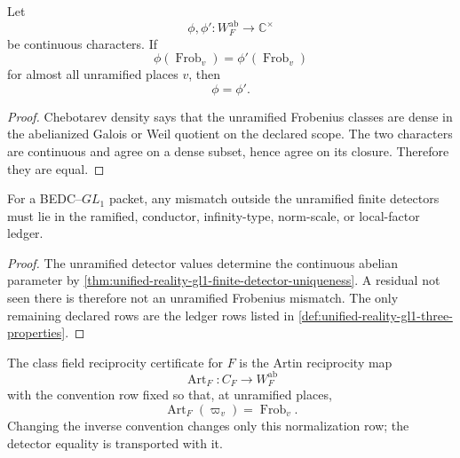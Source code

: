 \begin{theorem}
\label{thm:unified-reality-gl1-finite-detector-uniqueness}
Let
$$
\phi,\phi':W_F^{\mathrm{ab}}\to\mathbb C^{\times}
$$
be continuous characters. If
$$
\phi(\operatorname{Frob}_v)=\phi'(\operatorname{Frob}_v)
$$
for almost all unramified places $v$, then
$$
\phi=\phi'.
$$
\end{theorem}
\begin{proof}
Chebotarev density says that the unramified Frobenius classes are dense
in the abelianized Galois or Weil quotient on the declared scope. The
two characters are continuous and agree on a dense subset, hence agree
on its closure. Therefore they are equal.
\end{proof}

\begin{corollary}
\label{cor:unified-reality-gl1-no-hidden-residual}
For a BEDC--$GL_1$ packet, any mismatch outside the unramified finite
detectors must lie in the ramified, conductor, infinity-type,
norm-scale, or local-factor ledger.
\end{corollary}
\begin{proof}
The unramified detector values determine the continuous abelian
parameter by
\autoref{thm:unified-reality-gl1-finite-detector-uniqueness}. A residual
not seen there is therefore not an unramified Frobenius mismatch. The
only remaining declared rows are the ledger rows listed in
\autoref{def:unified-reality-gl1-three-properties}.
\end{proof}

\begin{definition}
\label{def:unified-reality-class-field-reciprocity-certificate}
The class field reciprocity certificate for $F$ is the Artin
reciprocity map
$$
\operatorname{Art}_F:C_F\to W_F^{\mathrm{ab}}
$$
with the convention row fixed so that, at unramified places,
$$
\operatorname{Art}_F(\varpi_v)=\operatorname{Frob}_v.
$$
Changing the inverse convention changes only this normalization row; the
detector equality is transported with it.
\end{definition}

